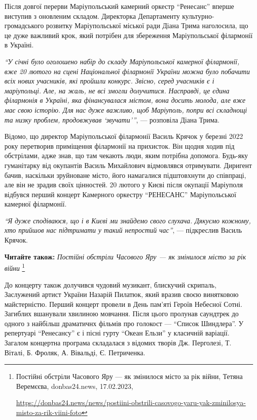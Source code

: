 Після довгої перерви Маріупольський камерний оркестр \enquote{Ренесанс} вперше виступив
з оновленим складом. Директорка Департаменту культурно-громадського розвитку
Маріупольської міської ради Діана Трима наголосила, що це дуже важливий крок,
який потрібен для збереження Маріупольської філармонії в Україні.

\begin{leftbar}
\emph{\enquote{У січні було оголошено набір до складу Маріупольської камерної філармонії,
вже 20 лютого на сцені Національної філармонії України можна було
побачити всіх нових учасників, які пройшли конкурс. Звісно, серед
учасників є і маріупольці. Але, на жаль, не всі змогли долучитися.
Насправді, це єдина філармонія в Україні, яка фінансувалася містом,
вона досить молода, але вже має свою історію. Для нас дуже важливо, щоб
Маріуполь, попри всі складнощі та низку проблем, продовжував \enquote{звучати}}},
— розповіла Діана Трима.
\end{leftbar}

Відомо, що директор Маріупольської філармонії Василь Крячок у березні 2022 року
перетворив приміщення філармонії на прихисток. Він щодня ходив під обстрілами,
адже знав, що там чекають люди, яким потрібна допомога. Будь-яку гуманітарку
від окупантів Василь Михайлович відмовлявся отримувати. Диригент бачив,
наскільки зруйноване місто, його намагалися підштовхнути до співпраці, але він
не зрадив своїх цінностей. 20 лютого у Києві після окупації Маріуполя відбувся
перший концерт Камерного оркестру \enquote{РЕНЕСАНС} Маріупольської камерної
філармонії.

\begin{leftbar}
\emph{\enquote{Я дуже сподіваюся, що і в Києві ми знайдемо свого слухача. Дякуємо кожному,
хто прийшов нас підтримати у такий непростий час}}, — підкреслив Василь
Крячок.
\end{leftbar}

\textbf{Читайте також:} \emph{Постійні обстріли Часового Яру — як змінилося місто за рік війни}%
\footnote{Постійні обстріли Часового Яру — як змінилося місто за рік війни, Тетяна Веремєєва, donbas24.news, 17.02.2023, \par%
\url{https://donbas24.news/news/postiini-obstrili-casovogo-yaru-yak-zminilosya-misto-za-rik-viini-foto}%
}


До концерту також долучився чудовий музикант, блискучий скрипаль, Заслужений
артист України Назарій Пилатюк, який вразив своєю винятковою майстерністю.
Перший концерт провели в День пам'яті Героїв Небесної Сотні. Загиблих вшанували
хвилиною мовчання. Після цього пролунав саундтрек до одного з найбільш
драматичнх фільмів про голокост — \enquote{Список Шиндлера}. У репертуарі \enquote{Ренесансу} є
і пісні гурту \enquote{Океан Ельзи} у класичній варіації. Загалом концертна програма
складалася з відомих творів Дж. Перголезі, Т. Віталі, Б. Фроляк, А. Вівальді,
Є. Петриченка.

